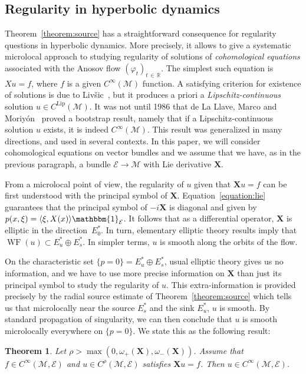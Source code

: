 \documentclass[10pt]{amsart}
\newtheorem{theo}{Theorem}[section]
\theoremstyle{definition}\newtheorem{defi}[theo]{Definition}\newtheorem{rema}[theo]{Remark}\newtheorem{exam}[theo]{Example}\newtheorem{exem}[theo]{Example}\newtheorem{nota}[theo]{Notation}
\newcommand{\R}{\mathbb{R}}
\newcommand{\X}{\mathbf{X}}
\newcommand{\M}{\mathcal{M}}
\newcommand{\E}{\mathcal{E}}
\newcommand{\Lip}{\mathrm{Lip}}
\DeclareMathOperator{\WF}{WF}
\begin{document}
\subsection{Regularity in hyperbolic dynamics}

Theorem~\ref{theorem:source} has a straightforward consequence for regularity questions in hyperbolic dynamics. More precisely, it allows to give a systematic microlocal approach to studying regularity of solutions of
\emph{cohomological equations} associated with the Anosov flow $(\varphi_t)_{t\,\in\,\R}$. The simplest such equation is $X u = f$, where $f$ is a given $C^\infty(\M)$ function. A satisfying criterion for existence of solutions is due to Liv{\v s}ic~\cite{Livsic-72}, but it produces a priori a \emph{Lipschitz-continuous} solution $u \in C^{\Lip}(\M)$. It was not until 1986 that de La Llave, Marco and Moriyón~\cite{DeLaLlave-Marco-Moryon-86} proved a bootstrap result, namely that if a Lipschitz-continuous solution $u$ exists, it is indeed $C^\infty(\M)$. This result was generalized in many directions, and used in several contexts. In this paper, we will consider cohomological equations on vector bundles and we assume that we have, as in the previous paragraph, a bundle $\E \to \M$ with Lie derivative $\X$.

From a microlocal point of view, the regularity of $u$ given that $\X u=f$ can be first understood with the principal symbol of $\X$. Equation~\eqref{equation:lie} guarantees that the principal symbol of $-i\X$ is diagonal and given by $p(x,\xi) = \langle \xi,X(x)\rangle \mathbbm{1}_{\E}$. It follows that as a differential operator, $\X$ is elliptic in the direction~$E^\ast_0$. In turn, elementary elliptic theory results imply that $\WF(u)\subset E^\ast_u\oplus E^\ast_s$. In simpler terms, $u$ is smooth along the orbits of the flow.

On the characteristic set $\{p= 0\} = E^\ast_u \oplus E^\ast_s$, usual elliptic theory gives us no information, and we have to use more precise information on $\X$ than just its principal symbol to study the regularity of $u$. This extra-information is provided precisely by the radial source estimate of Theorem~\ref{theorem:source} which tells us that microlocally near the source $E^\ast_s$ and the sink $E^\ast_u$, $u$ is smooth. By standard propagation of singularity, we can then conclude that $u$ is smooth microlocally everywhere on $\{p= 0\}$. We state this as the following result:

\begin{theo}\label{theorem:regularity}
Let $\rho> \max(0,\omega_+(\X),\omega_-(\X))$. Assume that $f\in C^{\infty}(\M,\E)$ and $u\in C^\rho(\M,\E)$ satisfies $\X u=f$. Then $u\in C^{\infty}(\M,\E)$.
\end{theo}
\end{document}
